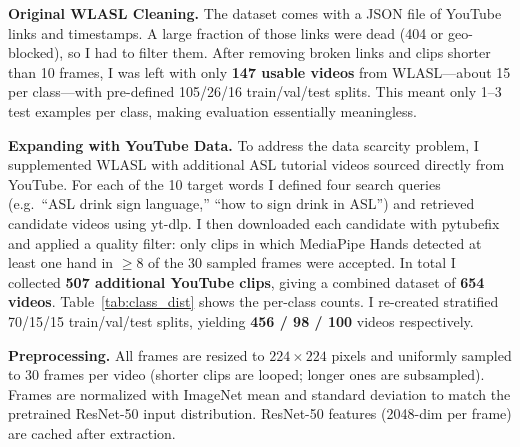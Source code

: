 \documentclass[final]{article}
\begin{document}
\textbf{Original WLASL Cleaning.}
The dataset comes with a JSON file of YouTube links and timestamps.
A large fraction of those links were dead (404 or geo-blocked), so I had to
filter them. After removing broken links and clips shorter than 10 frames, I
was left with only \textbf{147 usable videos} from WLASL---about 15 per
class---with pre-defined 105/26/16 train/val/test splits.
This meant only 1--3 test examples per class, making evaluation essentially
meaningless.

\textbf{Expanding with YouTube Data.}
To address the data scarcity problem, I supplemented WLASL with additional
ASL tutorial videos sourced directly from YouTube.  For each of the 10 target
words I defined four search queries (e.g.\ ``ASL drink sign language,''
``how to sign drink in ASL'') and retrieved candidate videos using yt-dlp.
I then downloaded each candidate with pytubefix and applied a quality filter:
only clips in which MediaPipe Hands detected at least one hand in
${\ge}8$ of the 30 sampled frames were accepted. In total I collected
\textbf{507 additional YouTube clips}, giving a combined dataset of
\textbf{654 videos}. Table~\ref{tab:class_dist} shows the per-class counts.
I re-created stratified 70/15/15 train/val/test splits, yielding
\textbf{456 / 98 / 100} videos respectively.

\begin{table}[h]
  \centering
  \caption{Per-class video counts in the combined WLASL+YouTube dataset
           (654 total; stratified 70/15/15 splits).}
  \label{tab:class_dist}
\end{table}

\textbf{Preprocessing.}
All frames are resized to $224{\times}224$ pixels and uniformly sampled to 30
frames per video (shorter clips are looped; longer ones are subsampled). Frames
are normalized with ImageNet mean and standard deviation to match the pretrained
ResNet-50 input distribution. ResNet-50 features (2048-dim per frame) are
cached after extraction.
\end{document}
